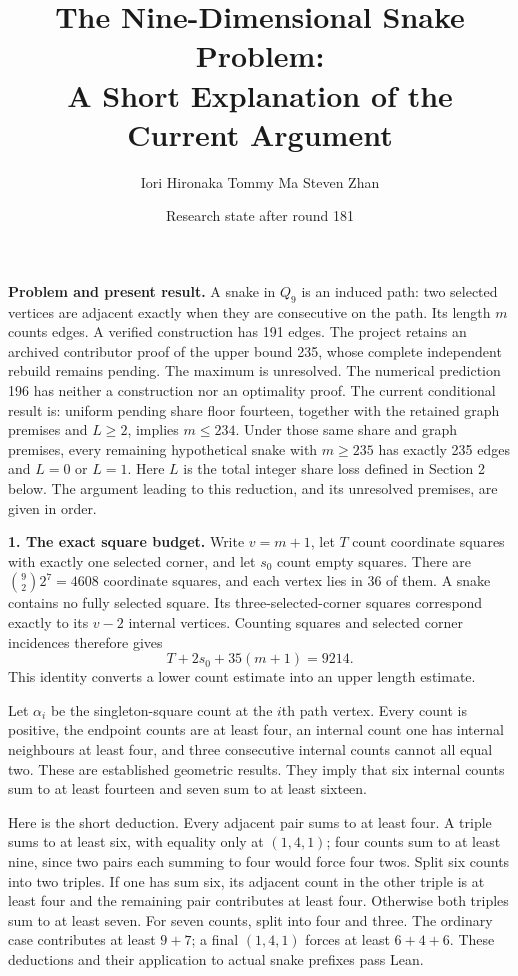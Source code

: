 \documentclass[11pt,a4paper]{article}
\title{The Nine-Dimensional Snake Problem:\\A Short Explanation of the Current Argument}
\author{Iori Hironaka \quad Tommy Ma \quad Steven Zhan}
\date{Research state after round 181}
\begin{document}
\maketitle

\textbf{Problem and present result.}
A snake in $Q_9$ is an induced path: two selected vertices are adjacent
exactly when they are consecutive on the path. Its length $m$ counts
edges. A verified construction has 191 edges. The project retains an
archived contributor proof of the upper bound 235, whose complete
independent rebuild remains pending. The maximum is unresolved.
The numerical prediction 196 has neither a construction nor an optimality
proof. The current conditional result is: uniform pending share floor
fourteen, together with the retained graph premises and $L\ge2$, implies
$m\le234$. Under those same share and graph premises, every remaining
hypothetical snake with $m\ge235$ has exactly 235 edges and $L=0$ or $L=1$.
Here $L$ is the total integer share loss defined in Section 2 below.
The argument leading to this reduction, and its unresolved premises,
are given in order.

\textbf{1. The exact square budget.}
Write $v=m+1$, let $T$ count coordinate squares with exactly one selected
corner, and let $s_0$ count empty squares. There are
$\binom92 2^7=4608$ coordinate squares, and each vertex lies in 36 of them.
A snake contains no fully selected square. Its three-selected-corner
squares correspond exactly to its $v-2$ internal vertices. Counting
squares and selected corner incidences therefore gives
\[
\boxed{T+2s_0+35(m+1)=9214.}
\]
This identity converts a lower count estimate into an upper length estimate.

Let $\alpha_i$ be the singleton-square count at the $i$th path vertex.
Every count is positive, the endpoint counts are at least four, an internal
count one has internal neighbours at least four, and three consecutive
internal counts cannot all equal two. These are established geometric
results. They imply that six internal counts sum to at least fourteen and
seven sum to at least sixteen.

Here is the short deduction. Every adjacent pair sums to at least four.
A triple sums to at least six, with equality only at $(1,4,1)$; four
counts sum to at least nine, since two pairs each summing to four would
force four twos. Split six counts into two triples. If one has sum six,
its adjacent count in the other triple is at least four and the remaining
pair contributes at least four. Otherwise both triples sum to at least
seven. For seven counts, split into four and three. The ordinary case
contributes at least $9+7$; a final $(1,4,1)$ forces at least $6+4+6$.
These deductions and their application to actual snake prefixes pass Lean.
\end{document}

